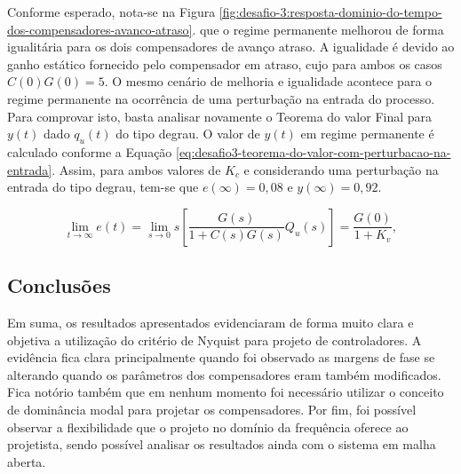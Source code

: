 Conforme esperado, nota-se na Figura
\ref{fig:desafio-3:resposta-dominio-do-tempo-dos-compensadores-avanco-atraso}.
que o regime permanente melhorou de forma igualitária para os dois compensadores
de avanço atraso. A igualidade é devido ao ganho estático fornecido pelo
compensador em atraso, cujo para ambos os casos $C(0)G(0) = 5$. O mesmo cenário
de melhoria e igualidade acontece para o regime permanente na ocorrência de uma
perturbação na entrada do processo. Para comprovar isto, basta analisar
novamente o Teorema do valor Final para $y(t)$ dado $q_u(t)$ do tipo degrau. O
valor de $y(t)$ em regime permanente é calculado conforme a Equação
\ref{eq:desafio3-teorema-do-valor-com-perturbacao-na-entrada}. Assim, para ambos
valores de $K_c$ e considerando uma perturbação na entrada do tipo degrau,
tem-se que $e(\infty) = 0,08$ e $y(\infty) = 0,92$. 

\begin{equation}
    \label{eq:desafio3-teorema-do-valor-com-perturbacao-na-entrada}
    \lim_{t \rightarrow \infty }e(t)=\lim_{s \rightarrow 0 }s
    \left [ \frac{G(s)}{1+C(s)G(s)}Q_u(s)  \right ]
    = \frac{G(0)}{1+K_v},
\end{equation}

\subsection{Conclusões}
Em suma, os resultados apresentados evidenciaram de forma muito clara e objetiva
a utilização do critério de Nyquist para projeto de controladores. A evidência
fica clara principalmente quando foi observado as margens de fase se alterando
quando os parâmetros dos compensadores eram também modificados. Fica notório
também que em nenhum momento foi necessário utilizar o conceito de dominância
modal para projetar os compensadores. Por fim, foi possível observar a
flexibilidade que o projeto no domínio da frequência oferece ao projetista,
sendo possível analisar os resultados ainda com o sistema em malha aberta.
